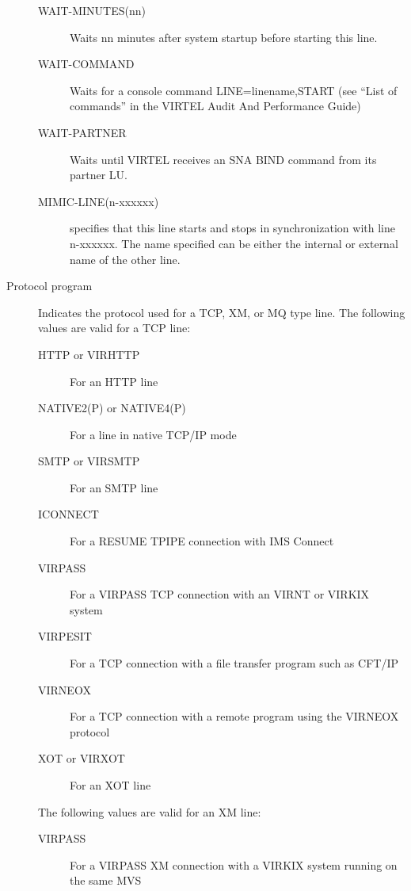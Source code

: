 \documentclass[letterpaper,10pt,english]{sphinxmanual}
\begin{document}
\begin{description}
\begin{description}
\item[{WAIT-MINUTES(nn)}] \leavevmode
Waits nn minutes after system startup before starting this line.

\item[{WAIT-COMMAND}] \leavevmode
Waits for a console command LINE=linename,START (see “List of
commands” in the VIRTEL Audit And Performance Guide)

\item[{WAIT-PARTNER}] \leavevmode
Waits until VIRTEL receives an SNA BIND command from its partner LU.

\item[{MIMIC-LINE(n-xxxxxx)}] \leavevmode
specifies that this line starts and stops in synchronization with
line n-xxxxxx. The name specified can be either the internal or
external name of the other line.

\end{description}

\item[{Protocol program}] \leavevmode
Indicates the protocol used for a TCP, XM, or MQ type line. The
following values are valid for a TCP line:
\begin{description}
\item[{HTTP or VIRHTTP}] \leavevmode
For an HTTP line

\item[{NATIVE2(P) or NATIVE4(P)}] \leavevmode
For a line in native TCP/IP mode

\item[{SMTP or VIRSMTP}] \leavevmode
For an SMTP line

\item[{ICONNECT}] \leavevmode
For a RESUME TPIPE connection with IMS Connect

\item[{VIRPASS}] \leavevmode
For a VIRPASS TCP connection with an VIRNT or VIRKIX system

\item[{VIRPESIT}] \leavevmode
For a TCP connection with a file transfer program such as CFT/IP

\item[{VIRNEOX}] \leavevmode
For a TCP connection with a remote program using the VIRNEOX
protocol

\item[{XOT or VIRXOT}] \leavevmode
For an XOT line

\end{description}

The following values are valid for an XM line:
\begin{description}
\item[{VIRPASS}] \leavevmode
For a VIRPASS XM connection with a VIRKIX system running on the same MVS


\end{description}
\end{description}
\end{document}
